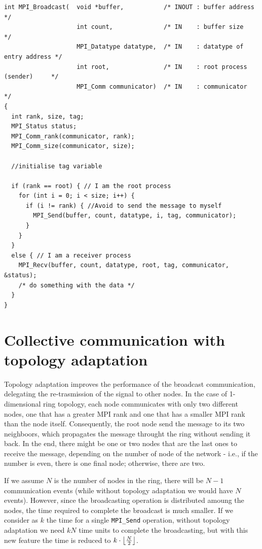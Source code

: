 \documentclass[a4paper]{article}
\DeclarePairedDelimiter\floor{\lfloor}{\rfloor}
\begin{document}
\begin{verbatim}
int MPI_Broadcast(  void *buffer,           /* INOUT : buffer address            */
                    int count,              /* IN    : buffer size               */
                    MPI_Datatype datatype,  /* IN    : datatype of entry address */
                    int root,               /* IN    : root process (sender)     */
                    MPI_Comm communicator)  /* IN    : communicator              */
{
  int rank, size, tag;
  MPI_Status status;
  MPI_Comm_rank(communicator, rank);
  MPI_Comm_size(communicator, size);

  //initialise tag variable

  if (rank == root) { // I am the root process
    for (int i = 0; i < size; i++) {
      if (i != rank) { //Avoid to send the message to myself
        MPI_Send(buffer, count, datatype, i, tag, communicator);
      }
    }
  }
  else { // I am a receiver process
    MPI_Recv(buffer, count, datatype, root, tag, communicator, &status);
    /* do something with the data */
  }
}

\end{verbatim}

\newpage

\section{Collective communication with topology adaptation}

Topology adaptation improves the performance of the broadcast communication, delegating the re-trasmission of the signal to other nodes. In the case of 1-dimensional ring topology, each node communicates with only two different nodes, one that has a greater MPI rank and one that has a smaller MPI rank than the node itself. Consequently, the root node send the message to its two neighboors, which propagates the message throught the ring without sending it back. In the end, there might be one or two nodes that are the last ones to receive the message, depending on the number of node of the network - i.e., if the number is even, there is one final node; otherwise, there are two.

If we assume $N$ is the number of nodes in the ring, there will be $N-1$ communication events (while without topology adaptation we would have $N$ events). However, since the broadcasting operation is distributed amoung the nodes, the time required to complete the broadcast is much smaller. If we consider as $k$ the time for a single \texttt{MPI\_Send} operation, without topology adaptation we need $kN$ time units to complete the broadcasting, but with this new feature the time is reduced to $k \cdot \floor*{\frac{N}{2}}$.
\end{document}
